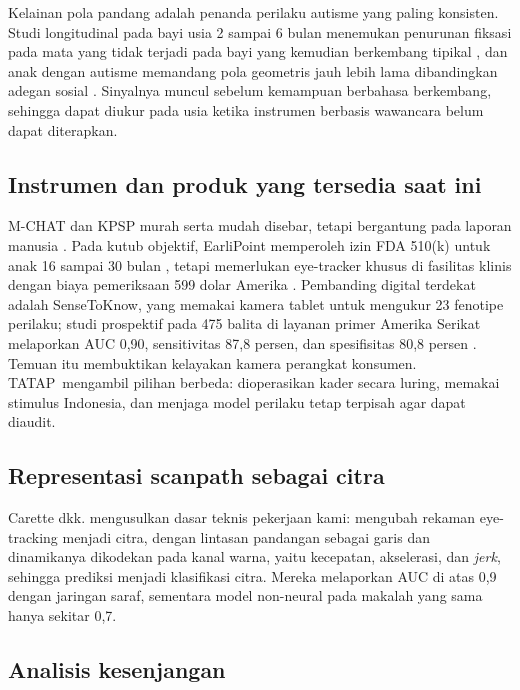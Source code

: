 \documentclass[10pt,letterpaper]{article}
\newcommand{\produk}{TATAP}
\begin{document}
Kelainan pola pandang adalah penanda perilaku autisme yang paling konsisten. Studi
longitudinal pada bayi usia 2 sampai 6 bulan menemukan penurunan fiksasi pada mata yang tidak
terjadi pada bayi yang kemudian berkembang tipikal \cite{jones2013}, dan anak dengan autisme
memandang pola geometris jauh lebih lama dibandingkan adegan sosial \cite{pierce2011}.
Sinyalnya muncul sebelum kemampuan berbahasa berkembang, sehingga dapat diukur pada usia
ketika instrumen berbasis wawancara belum dapat diterapkan.

\subsection{Instrumen dan produk yang tersedia saat ini}

M-CHAT dan KPSP murah serta mudah disebar, tetapi bergantung pada laporan manusia
\cite{mardhika2022}. Pada kutub objektif, EarliPoint memperoleh izin FDA 510(k) untuk anak 16
sampai 30 bulan \cite{earlitec2023}, tetapi memerlukan eye-tracker khusus di fasilitas klinis
dengan biaya pemeriksaan 599 dolar Amerika \cite{earlipointfaq}. Pembanding digital terdekat
adalah SenseToKnow, yang memakai kamera tablet untuk mengukur 23 fenotipe perilaku; studi
prospektif pada 475 balita di layanan primer Amerika Serikat melaporkan AUC 0,90, sensitivitas
87,8 persen, dan spesifisitas 80,8 persen \cite{perochon2023}. Temuan itu membuktikan
kelayakan kamera perangkat konsumen. \produk\ mengambil pilihan berbeda: dioperasikan kader
secara luring, memakai stimulus Indonesia, dan menjaga model perilaku tetap terpisah agar
dapat diaudit.

\subsection{Representasi scanpath sebagai citra}

Carette dkk. \cite{carette2019} mengusulkan dasar teknis pekerjaan kami: mengubah rekaman
eye-tracking menjadi citra, dengan lintasan pandangan sebagai garis dan dinamikanya dikodekan
pada kanal warna, yaitu kecepatan, akselerasi, dan \textit{jerk}, sehingga prediksi menjadi
klasifikasi citra. Mereka melaporkan AUC di atas 0,9 dengan jaringan saraf, sementara model
non-neural pada makalah yang sama hanya sekitar 0,7.

\subsection{Analisis kesenjangan}
\end{document}
